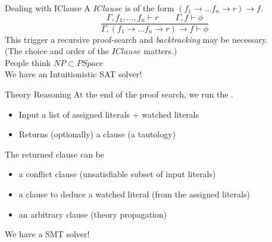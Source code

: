 \documentclass{beamer}
\begin{document}
\begin{frame}{Dealing with IClause}
  A $\mathit{IClause}$ is of the form $(f_1 \to \dots f_n \to r) \to f$.\\
  \bigskip
  \[
    \dfrac{\Gamma, f_1,\dots, f_n \vdash r \qquad \Gamma, f \vdash \phi}
    { \Gamma , (f_1 \to \dots f_n \to r) \to f \vdash \phi}
  \]
  This trigger a recursive proof-search and \emph{backtracking} may be necessary.\\
  (The choice and order of the $\mathit{IClause}$ matters.)\\
  \bigskip    
  People think $NP \subset PSpace$\\
  \bigskip
We have an Intuitionistic SAT solver!
\end{frame}


\begin{frame}[fragile]{Theory Reasoning}
  At the end of the proof search, we run the .\\
  \begin{itemize}
  \item Input a list of assigned literals + watched literals
  \item Returns (optionally) a clause (a tautology)
  \end{itemize}
The returned  clause can be
\begin{itemize}
\item a conflict clause (unsatisfiable subset of input literals)
\item a clause to deduce a watched literal (from the assigned literals)
\item an arbitrary clause (theory propagation)
\end{itemize}
We have a SMT solver!

\end{frame}
\end{document}
